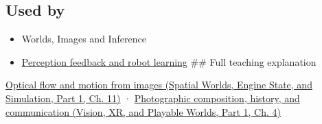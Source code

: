 \subsection{Used by}\label{appendix-e2e73f8cd93e-used-by}

\hypertarget{appendix-e2e73f8cd93e-used-by}{}

\begin{itemize}
\item
  {Worlds, Images and Inference}
\item
  \hyperref[appendix-b0c42da325f1]{Perception feedback and robot learning} \#\# Full teaching explanation
\end{itemize}

\href{../05-Spatial-Worlds-Engine-State-and-Simulation-P01/main.pdf\#nameddest=04-visual-computing-ii-ch030-optical-flow-and-motion-from-images}{Optical flow and motion from images (Spatial Worlds, Engine State, and Simulation, Part 1, Ch. 11)} · \href{../07-Vision-XR-and-Playable-Worlds-P01/main.pdf\#nameddest=04-visual-computing-ii-ch034-photographic-composition-history-and-communication}{Photographic composition, history, and communication (Vision, XR, and Playable Worlds, Part 1, Ch. 4)}
